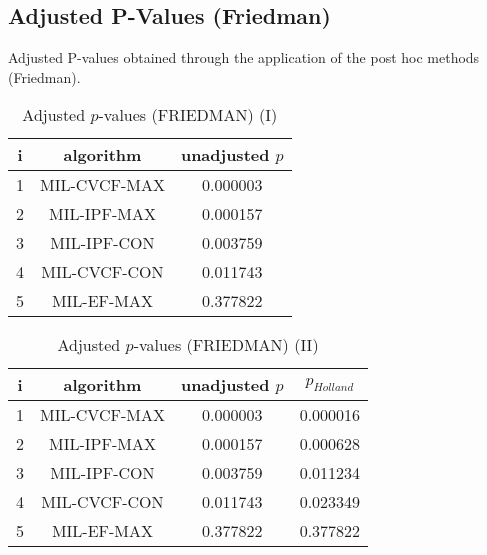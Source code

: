 \documentclass[a4paper,10pt]{article}
\begin{document}
\begin{landscape}
\newpage

\section{Adjusted P-Values (Friedman)}


Adjusted P-values obtained through the application of the post hoc methods (Friedman).

\begin{table}[!htp]
\centering\small
\begin{tabular}{ccc}
i&algorithm&unadjusted $p$\\
\hline1&MIL-CVCF-MAX&0.000003\\2&MIL-IPF-MAX&0.000157\\3&MIL-IPF-CON&0.003759\\4&MIL-CVCF-CON&0.011743\\5&MIL-EF-MAX&0.377822\\\hline
\end{tabular}
\caption{Adjusted $p$-values (FRIEDMAN) (I)}
\end{table}
\begin{table}[!htp]
\centering\small
\begin{tabular}{cccc}
i&algorithm&unadjusted $p$&$p_{Holland}$\\
\hline1&MIL-CVCF-MAX&0.000003&0.000016\\2&MIL-IPF-MAX&0.000157&0.000628\\3&MIL-IPF-CON&0.003759&0.011234\\4&MIL-CVCF-CON&0.011743&0.023349\\5&MIL-EF-MAX&0.377822&0.377822\\\hline
\end{tabular}
\caption{Adjusted $p$-values (FRIEDMAN) (II)}
\end{table}

\newpage
\end{landscape}
\end{document}
